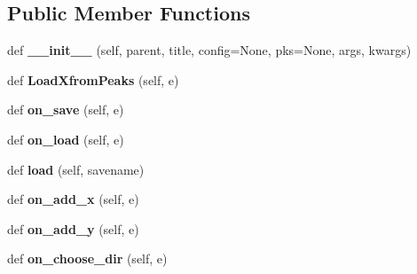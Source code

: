 \subsection*{Public Member Functions}
\begin{DoxyCompactItemize}
\item 
\hypertarget{class_uni_dec_1_1datacollector_1_1_data_collector_abd503261078a47fab0881a9cde2e6628}{}def {\bfseries \+\_\+\+\_\+init\+\_\+\+\_\+} (self, parent, title, config=None, pks=None, args, kwargs)\label{class_uni_dec_1_1datacollector_1_1_data_collector_abd503261078a47fab0881a9cde2e6628}

\item 
\hypertarget{class_uni_dec_1_1datacollector_1_1_data_collector_a5d2d1e46ded469ae0833fdf04c5657c5}{}def {\bfseries Load\+Xfrom\+Peaks} (self, e)\label{class_uni_dec_1_1datacollector_1_1_data_collector_a5d2d1e46ded469ae0833fdf04c5657c5}

\item 
\hypertarget{class_uni_dec_1_1datacollector_1_1_data_collector_a06e6d8e6bc978e9f0db170c7c45d4a99}{}def {\bfseries on\+\_\+save} (self, e)\label{class_uni_dec_1_1datacollector_1_1_data_collector_a06e6d8e6bc978e9f0db170c7c45d4a99}

\item 
\hypertarget{class_uni_dec_1_1datacollector_1_1_data_collector_af98fcc642854467c45010a5175f5bcad}{}def {\bfseries on\+\_\+load} (self, e)\label{class_uni_dec_1_1datacollector_1_1_data_collector_af98fcc642854467c45010a5175f5bcad}

\item 
\hypertarget{class_uni_dec_1_1datacollector_1_1_data_collector_a023d2c1a82e946c953543deecd51adb4}{}def {\bfseries load} (self, savename)\label{class_uni_dec_1_1datacollector_1_1_data_collector_a023d2c1a82e946c953543deecd51adb4}

\item 
\hypertarget{class_uni_dec_1_1datacollector_1_1_data_collector_a451883537c40095af8c5bcf496bda102}{}def {\bfseries on\+\_\+add\+\_\+x} (self, e)\label{class_uni_dec_1_1datacollector_1_1_data_collector_a451883537c40095af8c5bcf496bda102}

\item 
\hypertarget{class_uni_dec_1_1datacollector_1_1_data_collector_a6c1769352a685815cbeb4b2e282de00e}{}def {\bfseries on\+\_\+add\+\_\+y} (self, e)\label{class_uni_dec_1_1datacollector_1_1_data_collector_a6c1769352a685815cbeb4b2e282de00e}

\item 
\hypertarget{class_uni_dec_1_1datacollector_1_1_data_collector_afb74bfc2dcd2bb3c42b54014d57a0a9a}{}def {\bfseries on\+\_\+choose\+\_\+dir} (self, e)\label{class_uni_dec_1_1datacollector_1_1_data_collector_afb74bfc2dcd2bb3c42b54014d57a0a9a}


\end{DoxyCompactItemize}

